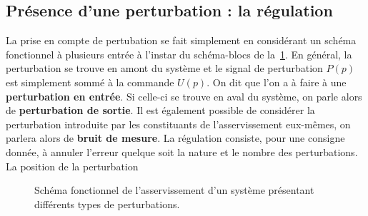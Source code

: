 \subsection{Présence d'une perturbation : la régulation}
La prise en compte de pertubation se fait simplement en considérant un schéma
fonctionnel à plusieurs entrée à l'instar du schéma-blocs de 
la~\cref{fig-pert2}. En général, la perturbation se trouve en amont
du système et le signal de perturbation $P(p)$ est simplement sommé à la commande
$U(p)$. On dit que l'on a à faire à une \textbf{perturbation en entrée}. 
Si celle-ci se trouve en aval du système, on parle alors de \textbf{perturbation de 
sortie}. Il est également possible de considérer la perturbation introduite par les
constituants de l'asservissement eux-mêmes, on parlera alors de 
\textbf{bruit de mesure}.
La régulation consiste, pour une consigne donnée, à annuler l'erreur 
quelque soit la nature et le nombre des perturbations.
%    
La position de la perturbation 

\begin{figure}[!h]
    \centering
    
    \caption{Schéma fonctionnel de l'asservissement d'un système 
             présentant différents types de perturbations. \label{fig-pert2}}
\end{figure}
